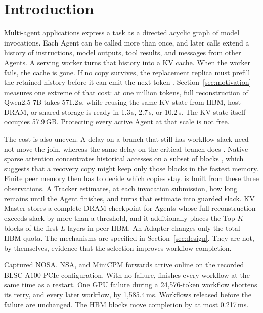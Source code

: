 \section{Introduction}
\label{sec:introduction}

Multi-agent applications express a task as a directed acyclic graph of model
invocations. Each Agent can be called more than once, and later calls extend
a history of instructions, model outputs, tool results, and messages from
other Agents. A serving worker turns that history into a KV cache. When the
worker fails, the cache is gone. If no copy survives, the replacement replica
must prefill the retained history before it can emit the next token
\cite{strati2024dejavu,cao2026lumen}. Section~\ref{sec:motivation} measures
one extreme of that cost: at one million tokens, full reconstruction of
Qwen2.5-7B takes 571.2\,s, while reusing the same KV state from HBM, host
DRAM, or shared storage is ready in 1.3\,s, 2.7\,s, or 10.2\,s. The KV state
itself occupies 57.9\,GB. Protecting every active Agent at that scale is not
free.

The cost is also uneven. A delay on a branch that still has workflow slack
need not move the join, whereas the same delay on the critical branch does
\cite{lin2024parrot}. Native sparse attention concentrates historical accesses
on a subset of blocks \cite{jiang2024minference,huang2026nosav2}, which
suggests that a recovery copy might keep only those blocks in the fastest
memory. Finite peer memory then has to decide which copies stay. \system is
built from these three observations. A Tracker estimates, at each invocation
submission, how long remains until the Agent finishes, and turns that
estimate into guarded slack. KV Master stores a complete DRAM checkpoint for
Agents whose full reconstruction exceeds slack by more than a threshold, and
it additionally places the Top-$K$ blocks of the first $L$ layers in peer
HBM. An Adapter changes only the total HBM quota. The mechanisms are
specified in Section~\ref{sec:design}. They are not, by themselves, evidence
that the selection improves workflow completion.

Captured NOSA, NSA, and MiniCPM forwards arrive online on the recorded
BLSC A100-PCIe configuration. With no failure, \system finishes every
workflow at the same time as a restart. One GPU failure during a
24{,}576-token workflow shortens its retry, and every later workflow, by
1{,}585.4\,ms. Workflows released before the failure are unchanged. The HBM
blocks move completion by at most 0.217\,ms.

